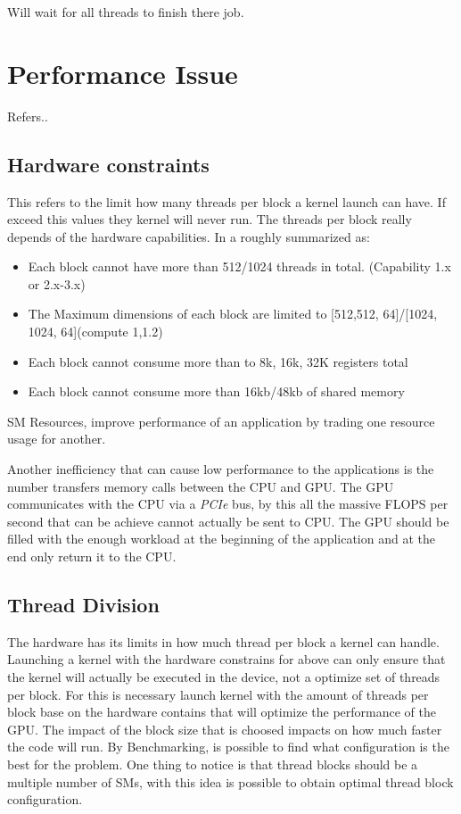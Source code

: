 Will wait for all threads to finish there job.


\section{Performance Issue}

Refers..

\subsection{Hardware constraints}

This refers to the limit how many threads per block a kernel launch can have. If exceed this values they kernel will never run. The threads per block really depends of the hardware capabilities. In a roughly summarized as:

\begin{itemize}
\item Each block cannot have more than 512/1024 threads in total. (Capability 1.x or 2.x-3.x)
\item The Maximum dimensions of each block are limited to [512,512, 64]/[1024, 1024, 64](compute 1,1.2)
\item Each block cannot consume more than to 8k, 16k, 32K registers total
\item Each block cannot consume more than 16kb/48kb of shared memory
\end{itemize}

SM Resources, improve performance of an application by trading one resource usage for another.  \cite{practices}

Another inefficiency that can cause low performance to the applications is the number transfers memory calls between the CPU and GPU. The GPU communicates with the CPU via a \textit{PCIe} bus, by this all the massive FLOPS per second that can be achieve cannot actually be sent to CPU. The GPU should be filled with the enough workload at the beginning of the application and at the end only return it to the CPU.

\subsection{Thread Division}

The hardware has its limits in how much thread per block a kernel can handle. Launching a kernel with the hardware constrains for above can only ensure that the kernel will actually be executed in the device, not a optimize set of threads per block. For this is necessary launch kernel with the amount of threads per block base on the hardware contains that will optimize the performance of the GPU. The impact of the block size that is choosed impacts on how much faster the code will run. By Benchmarking, is possible to find what configuration is the best for the problem. One thing to notice is that thread blocks should be a multiple number of SMs, with this idea is possible to obtain optimal thread block configuration.




